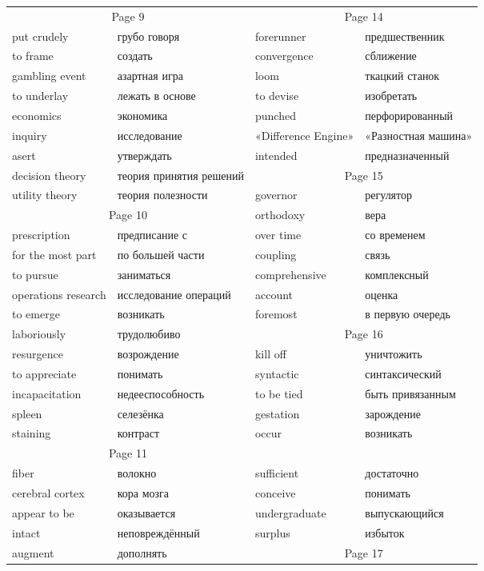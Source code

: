 \documentclass[12pt]{article}
\begin{document}
\begin{tabular}{| l l | l l | }
  \hline
  \multicolumn{2}{c|}{Page 9} & \multicolumn{2}{c|}{Page 14} \\
  put crudely & грубо говоря & forerunner & предшественник\\
  to frame & создать & convergence & сближение \\
  gambling event & азартная игра & loom & ткацкий станок \\
  to underlay & лежать в основе & to devise & изобретать \\
  economics & экономика & punched & перфорированный \\
  inquiry & исследование & «Difference Engine» & «Разностная машина» \\
  asert & утверждать & intended & предназначенный \\ \cline{3-4}
  decision theory & теория принятия решений & \multicolumn{2}{c|}{Page 15} \\ 
  utility theory & теория полезности & governor & регулятор \\ \cline{1-2}
  \multicolumn{2}{c|}{Page 10} & orthodoxy & вера \\ 
  prescription & предписание с & over time & со временем \\
  for the most part & по большей части & coupling & связь \\
  to pursue & заниматься & comprehensive & комплексный \\
  operations research & исследование операций & account & оценка \\

  to emerge & возникать & foremost & в первую очередь \\  \cline{3-4}
  laboriously & трудолюбиво& \multicolumn{2}{c|}{Page 16} \\
  resurgence & возрождение & kill off & уничтожить \\
  to appreciate & понимать & syntactic & синтаксический \\
  incapacitation & недееспособность & to be tied & быть привязанным \\ 
  spleen & селезёнка & gestation & зарождение \\
  staining & контраст & occur & возникать \\ 
  \cline{1-2}

  \multicolumn{2}{c|}{Page 11} \\
  fiber & волокно & sufficient & достаточно \\
  cerebral cortex & кора мозга & conceive & понимать \\
  appear to be & оказывается & undergraduate & выпускающийся \\
  intact & неповреждённый & surplus & избыток \\ \cline{3-4}
  augment & дополнять & \multicolumn{2}{c|}{Page 17} \\ \cline{1-2}


\end{tabular}
\end{document}
